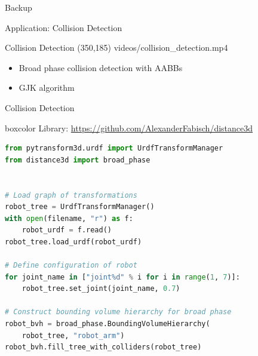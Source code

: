 \documentclass[14pt,aspectratio=169]{beamer}
\begin{document}
\begin{frame}
\begin{center}
\Large
Backup
\end{center}
\end{frame}

\begin{frame}
\begin{center}
\Large
Application: Collision Detection
\end{center}
\end{frame}

\begin{frame}{Collision Detection}
\makebox(350,185){
{videos/collision_detection.mp4}}
\begin{itemize}
\item Broad phase collision detection with AABBs
\item GJK algorithm \parencite{Gilbert1988}
\end{itemize}
\end{frame}

\begin{frame}[fragile]{Collision Detection}
\begin{beamercolorbox}[wd=\textwidth,sep=5pt]{boxcolor}
\centering
{\footnotesize Library:
\url{https://github.com/AlexanderFabisch/distance3d}}
\end{beamercolorbox}

\begin{lstlisting}[language=Python]
from pytransform3d.urdf import UrdfTransformManager
from distance3d import broad_phase


# Load graph of transformations
robot_tree = UrdfTransformManager()
with open(filename, "r") as f:
    robot_urdf = f.read()
robot_tree.load_urdf(robot_urdf)

# Define configuration of robot
for joint_name in ["joint%d" % i for i in range(1, 7)]:
    robot_tree.set_joint(joint_name, 0.7)

# Construct bounding volume hierarchy for broad phase
robot_bvh = broad_phase.BoundingVolumeHierarchy(
    robot_tree, "robot_arm")
robot_bvh.fill_tree_with_colliders(robot_tree)
\end{lstlisting}
\end{frame}
\end{document}
